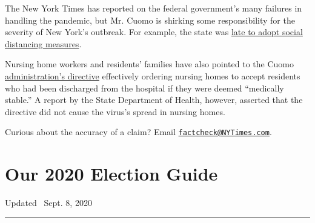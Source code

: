 The New York Times has reported on the federal government's many
failures in handling the pandemic, but Mr. Cuomo is shirking some
responsibility for the severity of New York's outbreak. For example, the
state was
\href{https://www.nytimes3xbfgragh.onion/2020/04/08/nyregion/new-york-coronavirus-response-delays.html}{late
to adopt social distancing measures}.

Nursing home workers and residents' families have also pointed to the
Cuomo
\href{https://www.nytimes3xbfgragh.onion/2020/07/08/nyregion/nursing-homes-deaths-coronavirus.html}{administration's
directive} effectively ordering nursing homes to accept residents who
had been discharged from the hospital if they were deemed ``medically
stable.'' A report by the State Department of Health, however, asserted
that the directive did not cause the virus's spread in nursing homes.

Curious about the accuracy of a claim? Email
\href{mailto:factcheck@NYTimes.com}{\nolinkurl{factcheck@NYTimes.com}}.

\hypertarget{our-2020-election-guide}{%
\section{Our 2020 Election Guide}\label{our-2020-election-guide}}

Updated ~Sept. 8, 2020

\begin{center}\rule{0.5\linewidth}{\linethickness}\end{center}

